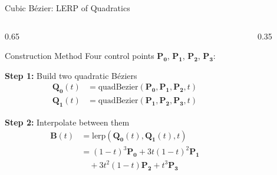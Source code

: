 \begin{frame}{Cubic Bézier: LERP of Quadratics}
  \begin{columns}
    \begin{column}{0.65\textwidth}
      \begin{mathbox}{Construction Method}
        \small
        Four control points $\mathbf{P_0}$, $\mathbf{P_1}$, $\mathbf{P_2}$, $\mathbf{P_3}$:

        \vspace{0.3cm}
        \textbf{Step 1:} Build two quadratic Béziers
        \begin{align*}
          \mathbf{Q_0}(t) &= \text{quadBezier}(\mathbf{P_0}, \mathbf{P_1}, \mathbf{P_2}, t) \\
          \mathbf{Q_1}(t) &= \text{quadBezier}(\mathbf{P_1}, \mathbf{P_2}, \mathbf{P_3}, t)
        \end{align*}

        \textbf{Step 2:} Interpolate between them
        \begin{align*}
          \mathbf{B}(t) &= \text{lerp}(\mathbf{Q_0}(t), \mathbf{Q_1}(t), t) \\
          &= (1-t)^3\mathbf{P_0} + 3t(1-t)^2\mathbf{P_1} \\
          &\quad+ 3t^2(1-t)\mathbf{P_2} + t^3\mathbf{P_3}
        \end{align*}
      \end{mathbox}
    \end{column}

    \begin{column}{0.35\textwidth}
      \begin{center}
\end{center}
\end{column}
\end{columns}
\end{frame}

